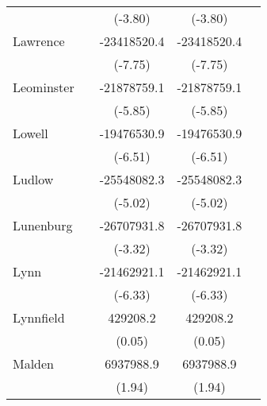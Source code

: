 {\begin{tabular}{l*{4}{c}}
                    &                     &     (-3.80)         &     (-3.80)         &                     \\
\addlinespace
Lawrence            &                     & -23418520.4\sym{***}& -23418520.4\sym{***}&                     \\
                    &                     &     (-7.75)         &     (-7.75)         &                     \\
\addlinespace
Leominster          &                     & -21878759.1\sym{***}& -21878759.1\sym{***}&                     \\
                    &                     &     (-5.85)         &     (-5.85)         &                     \\
\addlinespace
Lowell              &                     & -19476530.9\sym{***}& -19476530.9\sym{***}&                     \\
                    &                     &     (-6.51)         &     (-6.51)         &                     \\
\addlinespace
Ludlow              &                     & -25548082.3\sym{***}& -25548082.3\sym{***}&                     \\
                    &                     &     (-5.02)         &     (-5.02)         &                     \\
\addlinespace
Lunenburg           &                     & -26707931.8\sym{***}& -26707931.8\sym{***}&                     \\
                    &                     &     (-3.32)         &     (-3.32)         &                     \\
\addlinespace
Lynn                &                     & -21462921.1\sym{***}& -21462921.1\sym{***}&                     \\
                    &                     &     (-6.33)         &     (-6.33)         &                     \\
\addlinespace
Lynnfield           &                     &    429208.2         &    429208.2         &                     \\
                    &                     &      (0.05)         &      (0.05)         &                     \\
\addlinespace
Malden              &                     &   6937988.9         &   6937988.9         &                     \\
                    &                     &      (1.94)         &      (1.94)         &                     \\

\end{tabular}}
